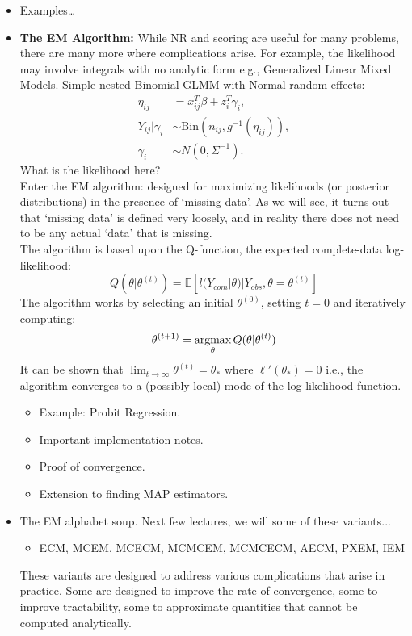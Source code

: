 \documentclass[11pt]{article}
\newcommand{\argmax}{\operatornamewithlimits{argmax}}
\begin{document}
\begin{itemize}
\item Examples\ldots

\item \textbf{The EM Algorithm:} While NR and scoring are useful for many problems, there are many more where complications arise. For example, the likelihood may involve integrals with no analytic form e.g., Generalized Linear Mixed Models. Simple nested Binomial GLMM with Normal random effects:
\begin{align*}
\eta_{ij} &= x_{ij}^{T}\beta + z_{i}^{T}\gamma_{i} , \\
Y_{ij} | \gamma_{i} &\sim \textrm{Bin}(n_{ij},g^{-1}(\eta_{ij})) , \\
\gamma_{i} &\sim N\left(0,\Sigma^{-1}\right) . 
\end{align*}
What is the likelihood here?\\
$ $\\
 Enter the EM algorithm: designed for maximizing likelihoods (or posterior distributions) in the presence of \lq{}missing data\rq{}. As we will see, it turns out that \lq{}missing data\rq{} is defined very loosely, and in reality there does not need to be any actual \lq{}data\rq{} that is missing.\\
$ $\\
The algorithm is based upon the Q-function, the expected complete-data log-likelihood:
\begin{equation}
Q(\theta{}|\theta^{(t)}) = \mathbb{E}\left[l(Y_{com}|\theta{})|Y_{obs},\theta{}=\theta^{(t)}\right]
\end{equation}
The algorithm works by selecting an initial $\theta^{(0)}$, setting $t=0$ and iteratively computing:
\begin{align*}
\theta^{(t+1)} = \argmax_{\theta} Q(\theta{}|\theta^{(t)})
\end{align*}
It can be shown that $\lim_{t\rightarrow\infty}\theta^{(t)}=\theta_{*}$ where $\ell{}'(\theta_{*})=0$ i.e., the algorithm converges to a (possibly local) mode of the log-likelihood function. 
\begin{itemize}
\item Example: Probit Regression.
\item Important implementation notes. 
\item Proof of convergence.
\item Extension to finding MAP estimators.
\end{itemize}

\item The EM alphabet soup. Next few lectures, we will some of these variants...
\begin{itemize}
\item ECM, MCEM, MCECM, MCMCEM, MCMCECM, AECM, PXEM, IEM  
\end{itemize}
These variants are designed to address various complications that arise in practice. Some are designed to improve the rate of convergence, some to improve tractability, some to approximate quantities that cannot be computed analytically.

\end{itemize}
\end{document}
